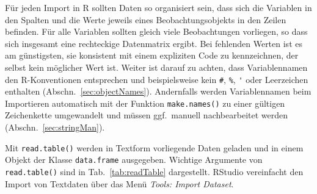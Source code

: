 Für jeden Import in R sollten Daten so organisiert sein, dass sich die Variablen in den Spalten und die Werte jeweils eines Beobachtungsobjekts in den Zeilen befinden. Für alle Variablen sollten gleich viele Beobachtungen vorliegen, so dass sich insgesamt eine rechteckige Datenmatrix ergibt. Bei fehlenden Werten ist es am günstigsten, sie konsistent mit einem expliziten Code zu kennzeichnen, der selbst kein möglicher Wert ist. Weiter ist darauf zu achten, dass Variablennamen den R-Konventionen entsprechen und beispielsweise kein \lstinline!#!, \lstinline!%!, \lstinline!'! oder Leerzeichen enthalten (Abschn.\ \ref{sec:objectNames}). Andernfalls werden Variablennamen beim Importieren automatisch mit der Funktion \lstinline!make.names()! zu einer gültigen Zeichenkette umgewandelt und müssen ggf.\ manuell nachbearbeitet werden (Abschn.\ \ref{sec:stringMan}).

Mit \lstinline!read.table()! werden in Textform vorliegende Daten geladen und in einem Objekt der Klasse \lstinline!data.frame! ausgegeben. Wichtige Argumente von \lstinline!read.table()! sind in Tab.\ \ref{tab:readTable} dargestellt. RStudio vereinfacht den Import von Textdaten über das Menü \emph{Tools: Import Dataset}.


